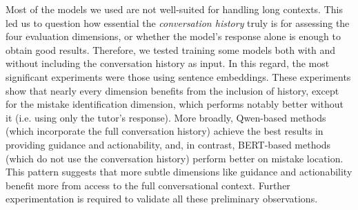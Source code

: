 \documentclass[11pt]{article}
\begin{document}
Most of the models we used are not well-suited for handling long contexts.
This led us to question how essential the \textit{conversation history} truly is for assessing the four evaluation dimensions, or whether the model's response alone is enough to obtain good results.
Therefore, we tested training some models both with and without including the conversation history as input.
In this regard, the most significant experiments were those using sentence embeddings.
These experiments show that nearly every dimension benefits from the inclusion of history, except for the mistake identification dimension, which performs notably better without it (i.e. using only the tutor's response).
More broadly, Qwen-based methods (which incorporate the full conversation history) achieve the best results in providing guidance and actionability, and, in contrast, BERT-based methods (which do not use the conversation history) perform better on mistake location.
This pattern suggests that more subtle dimensions like guidance and actionability benefit more from access to the full conversational context.
Further experimentation is required to validate all these preliminary observations.

\end{document}
